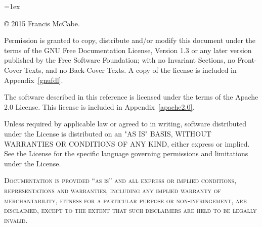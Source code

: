 \documentclass[11pt,openright,fleqn]{book}
\begin{document}
\newpage{}
{{
\parindent=0in
\parskip=1ex

\thispagestyle{fancy}
\fancyhf{} %
\newcommand{\tstamp}{\today}   
\newcommand{\Draft}{\sc draft}

\copyright{} 2015 Francis McCabe.
\vspace*{1ex}

Permission is granted to copy, distribute and/or modify this document
under the terms of the GNU Free Documentation License, Version 1.3
or any later version published by the Free Software Foundation;
with no Invariant Sections, no Front-Cover Texts, and no Back-Cover Texts.
A copy of the license is included in Appendix~\vref{gnufdl}.

The software described in this reference is licensed under the terms of the Apache 2.0 License. This license is included in Appendix~\vref{apache2.0}.

Unless required by applicable law or agreed to in writing, software
distributed under the License is distributed on an "AS IS" BASIS,
WITHOUT WARRANTIES OR CONDITIONS OF ANY KIND, either express or implied.
See the License for the specific language governing permissions and
limitations under the License.

\textsc{Documentation is provided ``as is'' and all express or implied conditions, representations and warranties, including any implied warranty of merchantability, fitness for a particular purpose or non-infringement, are disclaimed, except to the extent that such disclaimers are held to be legally invalid.}
}
\newpage{}

\pagestyle{fancy}
\renewcommand{\chaptermark}[1]{\markboth{\thechapter\ #1}{}} \renewcommand{\sectionmark}[1]{\markright{\thesection\ #1}}
\fancyhf{} %

\newcommand{\blueLine}{{\color{skyBlue}%
  \hrule width\headwidth height\headrulewidth \vskip-\headrulewidth}}


\fancyhead[LE,RO]{\bfseries}
\fancyhead[LO]{\bfseries\rightmark}
\fancyhead[RE]{\bfseries\leftmark}


\renewcommand{\headrulewidth}{0.5pt}
\renewcommand{\headrule}{{\blueLine}}

\renewcommand{\footrulewidth}{0.5pt}
\renewcommand{\footrule}{{\color{skyBlue}%
  \vskip-\footruleskip\vskip-\footrulewidth
\hrule width\headwidth height\footrulewidth\vskip\footruleskip}}
\addtolength{\headheight}{15pt} %


}
\end{document}
